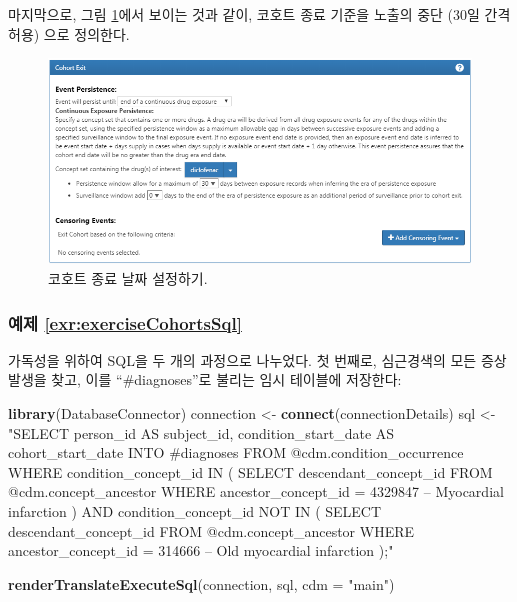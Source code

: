 \documentclass[11pt]{book}
\newenvironment{Shaded}{\begin{snugshade}}{\end{snugshade}}
\newcommand{\KeywordTok}[1]{\textcolor[rgb]{0.13,0.29,0.53}{\textbf{#1}}}
\newcommand{\DataTypeTok}[1]{\textcolor[rgb]{0.13,0.29,0.53}{#1}}
\newcommand{\StringTok}[1]{\textcolor[rgb]{0.31,0.60,0.02}{#1}}
\newcommand{\NormalTok}[1]{#1}
\theoremstyle{definition}
\theoremstyle{definition}
\theoremstyle{definition}
\theoremstyle{remark}
\begin{document}
마지막으로, 그림 \ref{fig:cohortsAtlasExit}에서 보이는 것과 같이, 코호트
종료 기준을 노출의 중단 (30일 간격 허용) 으로 정의한다.

\begin{figure}

{\centering \includegraphics[width=1\linewidth]{images/SuggestedAnswers/cohortsAtlasExit} 

}

\caption{코호트 종료 날짜 설정하기.}\label{fig:cohortsAtlasExit}
\end{figure}

\subsubsection*{예제
\ref{exr:exerciseCohortsSql}}\label{-refexrexercisecohortssql}

가독성을 위하여 SQL을 두 개의 과정으로 나누었다. 첫 번째로, 심근경색의
모든 증상 발생을 찾고, 이를 ``\#diagnoses''로 불리는 임시 테이블에
저장한다:

\begin{Shaded}
\begin{Highlighting}[]
\KeywordTok{library}\NormalTok{(DatabaseConnector)}
\NormalTok{connection <-}\StringTok{ }\KeywordTok{connect}\NormalTok{(connectionDetails)}
\NormalTok{sql <-}\StringTok{ "SELECT person_id AS subject_id,}
\StringTok{  condition_start_date AS cohort_start_date}
\StringTok{INTO #diagnoses}
\StringTok{FROM @cdm.condition_occurrence}
\StringTok{WHERE condition_concept_id IN (}
\StringTok{    SELECT descendant_concept_id}
\StringTok{    FROM @cdm.concept_ancestor}
\StringTok{    WHERE ancestor_concept_id = 4329847 -- Myocardial infarction}
\StringTok{)}
\StringTok{  AND condition_concept_id NOT IN (}
\StringTok{    SELECT descendant_concept_id}
\StringTok{    FROM @cdm.concept_ancestor}
\StringTok{    WHERE ancestor_concept_id = 314666 -- Old myocardial infarction}
\StringTok{);"}

\KeywordTok{renderTranslateExecuteSql}\NormalTok{(connection, sql, }\DataTypeTok{cdm =} \StringTok{"main"}\NormalTok{)}
\end{Highlighting}
\end{Shaded}
\end{document}
